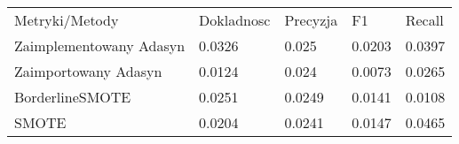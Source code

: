 \begin{tabular}{lllll}
\hline
 Metryki/Metody          & Dokladnosc & Precyzja & F1     & Recall \\
 Zaimplementowany Adasyn & 0.0326     & 0.025    & 0.0203 & 0.0397 \\
 Zaimportowany Adasyn    & 0.0124     & 0.024    & 0.0073 & 0.0265 \\
 BorderlineSMOTE         & 0.0251     & 0.0249   & 0.0141 & 0.0108 \\
 SMOTE                   & 0.0204     & 0.0241   & 0.0147 & 0.0465 \\
\hline
\end{tabular}